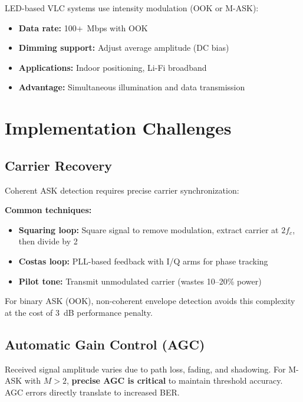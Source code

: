 LED-based VLC systems use intensity modulation (OOK or M-ASK):

\begin{itemize}
\item \textbf{Data rate:} 100+~Mbps with OOK
\item \textbf{Dimming support:} Adjust average amplitude (DC bias)
\item \textbf{Applications:} Indoor positioning, Li-Fi broadband
\item \textbf{Advantage:} Simultaneous illumination and data transmission
\end{itemize}



\section{Implementation Challenges}

\subsection{Carrier Recovery}

Coherent ASK detection requires precise carrier synchronization:

\textbf{Common techniques:}
\begin{itemize}
\item \textbf{Squaring loop:} Square signal to remove modulation, extract carrier at $2f_c$, then divide by 2
\item \textbf{Costas loop:} PLL-based feedback with I/Q arms for phase tracking
\item \textbf{Pilot tone:} Transmit unmodulated carrier (wastes 10--20\% power)
\end{itemize}

For binary ASK (OOK), non-coherent envelope detection avoids this complexity at the cost of 3~dB performance penalty.

\subsection{Automatic Gain Control (AGC)}

\begin{warningbox}
Received signal amplitude varies due to path loss, fading, and shadowing. For M-ASK with $M > 2$, \textbf{precise AGC is critical} to maintain threshold accuracy. AGC errors directly translate to increased BER.
\end{warningbox}

